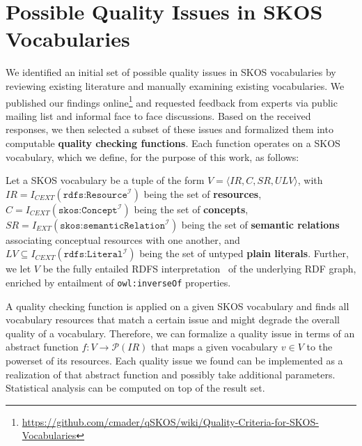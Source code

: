 
\section{Possible Quality Issues in SKOS Vocabularies}\label{sec:criteria}


We identified an initial set of possible quality issues in SKOS vocabularies by reviewing existing literature and manually examining existing vocabularies. We published our findings online\footnote{\url{https://github.com/cmader/qSKOS/wiki/Quality-Criteria-for-SKOS-Vocabularies}} and requested feedback from experts via public mailing list and informal face to face discussions. Based on the received responses, we then selected a subset of these issues and formalized them into computable \textbf{quality checking functions}. Each function operates on a SKOS vocabulary, which we define, for the purpose of this work, as follows:

\begin{definition} Let a SKOS vocabulary be a tuple of the form $V = \langle IR, C, SR, ULV \rangle$, with \(IR = I_{CEXT}(\texttt{rdfs:Resource}^\mathcal{I})\) being the set of \textbf{resources}, \(C = I_{CEXT}(\texttt{skos:Concept}^\mathcal{I})\) being the set of \textbf{concepts}, \(SR = I_{EXT}(\texttt{skos:semanticRelation}^\mathcal{I})\) being the set of \textbf{semantic relations} associating conceptual resources with one another, and $LV \subseteq I_{CEXT}(\texttt{rdfs:Literal}^\mathcal{I})$ being the set of untyped \textbf{plain literals}. Further, we let $V$ be the fully entailed RDFS interpretation~\cite{RDFSEM2012} of the underlying RDF graph, enriched by entailment of \texttt{owl:inverseOf} properties. 

\end{definition}

A quality checking function is applied on a given SKOS vocabulary and finds all vocabulary resources that match a certain issue and might degrade the overall quality of a vocabulary. Therefore, we can formalize a quality issue in terms of an abstract function $f:V \rightarrow \mathcal{P}(IR)$ that maps a given vocabulary $v \in V$ to the powerset of its resources. Each quality issue we found can be implemented as a realization of that abstract function and possibly take additional parameters. Statistical analysis can be computed on top of the result set.

